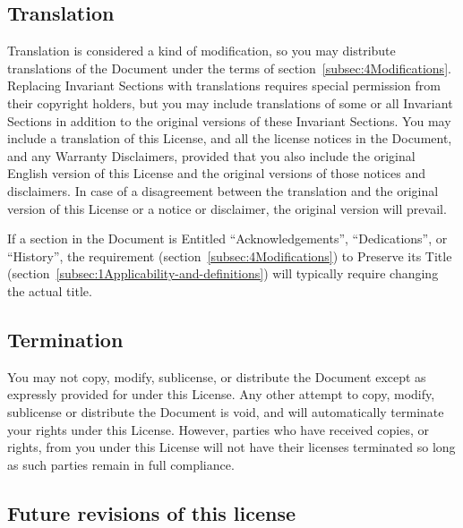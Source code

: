 \subsection*{{\tiny{}Translation}}

{\tiny{}Translation is considered a kind of modification, so you may
distribute translations of the Document under the terms of section~\ref{subsec:4Modifications}.
Replacing Invariant Sections with translations requires special permission
from their copyright holders, but you may include translations of
some or all Invariant Sections in addition to the original versions
of these Invariant Sections. You may include a translation of this
License, and all the license notices in the Document, and any Warranty
Disclaimers, provided that you also include the original English version
of this License and the original versions of those notices and disclaimers.
In case of a disagreement between the translation and the original
version of this License or a notice or disclaimer, the original version
will prevail.}{\tiny\par}

{\tiny{}If a section in the Document is Entitled \textquotedblleft Acknowledgements\textquotedblright ,
\textquotedblleft Dedications\textquotedblright , or \textquotedblleft History\textquotedblright ,
the requirement (section~\ref{subsec:4Modifications}) to Preserve
its Title (section~\ref{subsec:1Applicability-and-definitions})
will typically require changing the actual title.}{\tiny\par}

\subsection*{{\tiny{}Termination}}

{\tiny{}You may not copy, modify, sublicense, or distribute the Document
except as expressly provided for under this License. Any other attempt
to copy, modify, sublicense or distribute the Document is void, and
will automatically terminate your rights under this License. However,
parties who have received copies, or rights, from you under this License
will not have their licenses terminated so long as such parties remain
in full compliance.}{\tiny\par}

\subsection*{{\tiny{}Future revisions of this license}}

